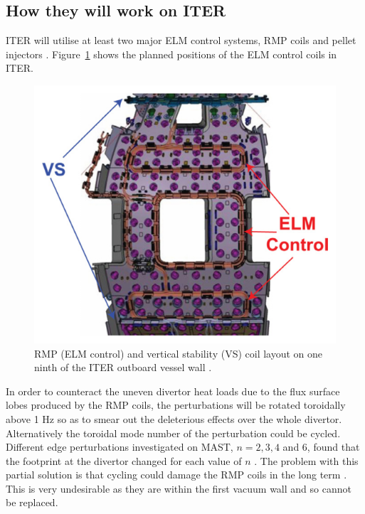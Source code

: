 \documentclass[12pt]{article}  %
\begin{document}
\subsection{How they will work on ITER}\label{ssec:onITER}
ITER will utilise at least two major ELM control systems, RMP coils and pellet injectors \cite{Loarte2010}. Figure~\ref{fig:ITERcoils} shows the planned positions of the ELM control coils in ITER.

\begin{figure}
\includegraphics[scale=0.5]{Figures/ITERcoils.png}
\centering
\caption{RMP (ELM control) and vertical stability (VS) coil layout on one ninth of the ITER outboard vessel wall \cite{Lang2013}.}\label{fig:ITERcoils}
\end{figure}

In order to counteract the uneven divertor heat loads due to the flux surface lobes produced by the RMP coils, the perturbations will be rotated toroidally above 1 Hz \cite{LoarteTR2013} so as to smear out the deleterious effects over the whole divertor. Alternatively the toroidal mode number of the perturbation could be cycled. Different edge perturbations investigated on MAST, $n=2,3,4$ and $6$, found that the footprint at the divertor changed for each value of $n$ \cite{Chapman2014}. The problem with this partial solution is that cycling could damage the RMP coils in the long term \cite{KirkFF}. This is very undesirable as they are within the first vacuum wall and so cannot be replaced. 
\end{document}
